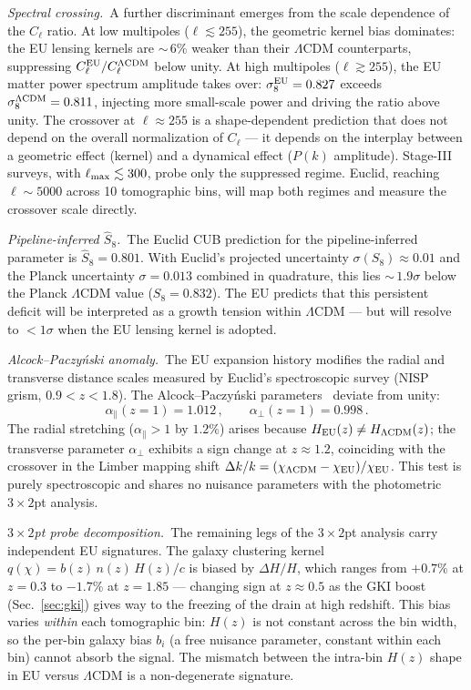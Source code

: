 \documentclass[a4paper,fleqn]{cas-dc}
\begin{document}
\textit{Spectral crossing.}~A further discriminant emerges from the
scale dependence of the $C_\ell$ ratio. At low multipoles
($\ell \lesssim 255$), the geometric kernel bias
dominates: the EU lensing kernels are ${\sim}\,6\%$ weaker
than their $\Lambda$CDM counterparts, suppressing
$C_\ell^{\rm EU}/C_\ell^{\Lambda{\rm CDM}}$ below unity.
At high multipoles ($\ell \gtrsim 255$), the EU matter
power spectrum amplitude takes over: $\sigma_8^{\rm EU} =
0.827$ exceeds $\sigma_8^{\Lambda{\rm CDM}} = 0.811$,
injecting more small-scale power and driving the ratio
above unity. The crossover at $\ell \approx 255$ is a
shape-dependent prediction that does not depend on
the overall normalization of $C_\ell$ --- it depends on
the interplay between a geometric effect (kernel) and
a dynamical effect ($P(k)$ amplitude). Stage-III surveys,
with $\ell_{\rm max} \lesssim 300$, probe only the
suppressed regime. Euclid, reaching $\ell \sim 5000$
across 10 tomographic bins, will map both regimes and
measure the crossover scale directly.

\textit{Pipeline-inferred $\hat{S}_8$.}~The Euclid CUB prediction for the
pipeline-inferred parameter is $\hat{S}_8 = 0.801$. With
Euclid's projected uncertainty $\sigma(S_8) \approx 0.01$
and the Planck uncertainty $\sigma = 0.013$ combined in
quadrature, this lies ${\sim}\,1.9\sigma$ below the Planck
$\Lambda$CDM value ($S_8 = 0.832$). The EU predicts that
this persistent deficit will be interpreted as a growth
tension within $\Lambda$CDM --- but will resolve to
$< 1\sigma$ when the EU lensing kernel is adopted.

\textit{Alcock--Paczy\'nski anomaly.}~The EU expansion
history modifies the radial and transverse distance
scales measured by Euclid's spectroscopic survey
(NISP grism, $0.9 < z < 1.8$). The Alcock--Paczy\'nski
parameters~\cite{alcock_paczynski1979} deviate from
unity:
\begin{equation}
\alpha_\parallel(z{=}1) = 1.012\,,\qquad
\alpha_\perp(z{=}1) = 0.998\,.
\label{eq:ap}
\end{equation}
The radial stretching ($\alpha_\parallel > 1$ by $1.2\%$)
arises because $H_{\rm EU}(z) \neq H_{\Lambda{\rm CDM}}(z)$;
the transverse parameter $\alpha_\perp$ exhibits a sign
change at $z \approx 1.2$, coinciding with the crossover
in the Limber mapping shift
$\Delta k/k = (\chi_{\Lambda{\rm CDM}} - \chi_{\rm EU})/
\chi_{\rm EU}$.
This test is purely spectroscopic and shares no nuisance
parameters with the photometric $3 \times 2$pt analysis.

\textit{$3 \times 2$pt probe decomposition.}~The remaining
legs of the $3 \times 2$pt analysis carry
independent EU signatures. The galaxy clustering kernel
$q(\chi) = b(z)\,n(z)\,H(z)/c$ is biased by
$\Delta H/H$, which ranges from $+0.7\%$ at $z = 0.3$
to $-1.7\%$ at $z = 1.85$ --- changing sign at
$z \approx 0.5$ as the GKI boost
(Sec.~\ref{sec:gki}) gives way to the freezing of the
drain at high redshift. This bias varies
\textit{within} each tomographic bin: $H(z)$ is not
constant across the bin width, so the per-bin galaxy
bias $b_i$ (a free nuisance parameter, constant within
each bin) cannot absorb the signal. The mismatch between
the intra-bin $H(z)$ shape in EU versus $\Lambda$CDM is
a non-degenerate signature.
\end{document}

